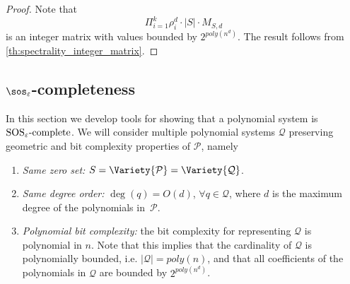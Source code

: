 \documentclass[11pt]{article}
\newcommand{\SOSe}{\rm{SOS}_\varepsilon\text{-complete}}
\begin{document}
\begin{proof}
    Note that
    \begin{equation*}
       \Pi_{i=1}^k \rho_i^d \cdot |S| \cdot M_{S,d}
    \end{equation*}
    is an integer matrix with values bounded by $2^{poly(n^d)}$. The result follows from \cref{th:spectrality_integer_matrix}.
\end{proof}

\subsection[SoS epsilon completeness]{$\sos_\varepsilon$-completeness}\label{sect:SOS_completeness}
In this section we develop tools for showing that a polynomial system is $\SOSe$.
We will consider multiple polynomial systems $\mathcal{Q}$ preserving geometric and bit complexity properties of $\mathcal{P}$, namely
\begin{enumerate}[label=A\arabic*.]
    \item \label{assumption_1} \textit{Same zero set:} $S = \Variety{\mathcal{P}} = \Variety{\mathcal{Q}}$.
    \item \label{assumption_2} \textit{Same degree order:} $\deg(q) = O(d)$, $ \forall q \in \mathcal{Q}$, where $d$ is the maximum degree of the polynomials in~$\mathcal{P}$.
    \item \label{assumption_3} \textit{Polynomial bit complexity:} the bit complexity for representing $\mathcal{Q}$ is polynomial in $n$. Note that this implies that the cardinality of $\mathcal{Q}$ is polynomially bounded, i.e. $|\mathcal{Q}| = poly(n)$, and that all coefficients of the polynomials in $\mathcal{Q}$ are bounded by $2^{poly(n^d)}$.
\end{enumerate}
\end{document}
